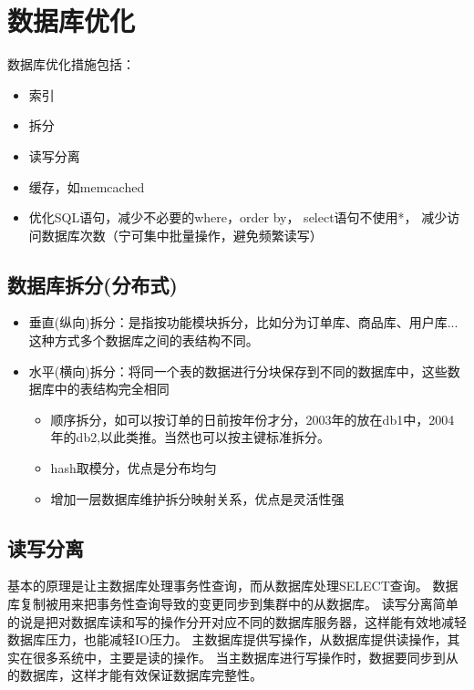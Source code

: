 \section{数据库优化}

数据库优化措施包括：
\begin{itemize}
    \item 索引
    \item 拆分
    \item 读写分离
    \item 缓存，如memcached
    \item 优化SQL语句，减少不必要的where，order by， select语句不使用*， 减少访问数据库次数（宁可集中批量操作，避免频繁读写）
\end{itemize}

\subsection{数据库拆分(分布式)}

\begin{itemize}
    \item 垂直(纵向)拆分：是指按功能模块拆分，比如分为订单库、商品库、用户库...这种方式多个数据库之间的表结构不同。
    \item 水平(横向)拆分：将同一个表的数据进行分块保存到不同的数据库中，这些数据库中的表结构完全相同
	\begin{itemize}
    		\item 顺序拆分，如可以按订单的日前按年份才分，2003年的放在db1中，2004年的db2,以此类推。当然也可以按主键标准拆分。
    		\item hash取模分，优点是分布均匀
		\item 增加一层数据库维护拆分映射关系，优点是灵活性强	
	\end{itemize}
\end{itemize}


\subsection{读写分离}
基本的原理是让主数据库处理事务性查询，而从数据库处理SELECT查询。
数据库复制被用来把事务性查询导致的变更同步到集群中的从数据库。
读写分离简单的说是把对数据库读和写的操作分开对应不同的数据库服务器，这样能有效地减轻数据库压力，也能减轻IO压力。
主数据库提供写操作，从数据库提供读操作，其实在很多系统中，主要是读的操作。
当主数据库进行写操作时，数据要同步到从的数据库，这样才能有效保证数据库完整性。


